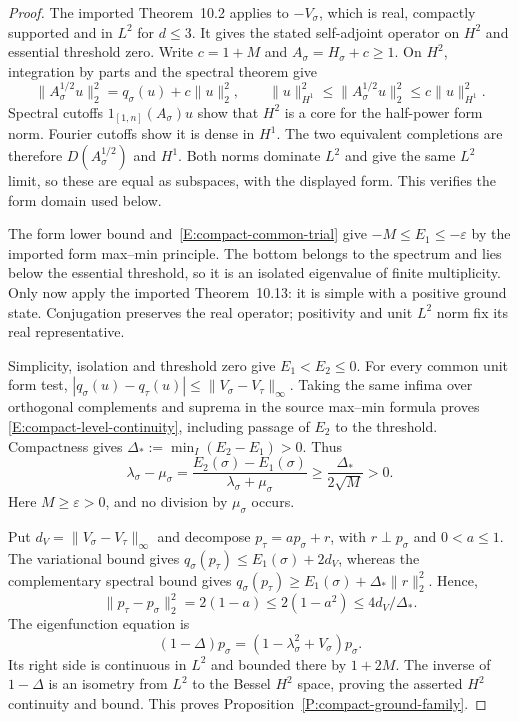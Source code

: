 \begin{proof}
  The imported Theorem~10.2 applies to $-V_\sigma$, which is real,
  compactly supported and in $L^2$ for $d\le3$. It gives the stated
  self-adjoint operator on $H^2$ and essential threshold zero.
  Write $c=1+M$ and $A_\sigma=H_\sigma+c\ge1$.
  On $H^2$, integration by parts and the spectral theorem give
  \[
    \|A_\sigma^{1/2}u\|_2^2
    =q_\sigma(u)+c\|u\|_2^2,\qquad
    \|u\|_{H^1}^2\le\|A_\sigma^{1/2}u\|_2^2
    \le c\|u\|_{H^1}^2.
  \]
  Spectral cutoffs $1_{[1,n]}(A_\sigma)u$ show that $H^2$ is a
  core for the half-power form norm. Fourier cutoffs show it is
  dense in $H^1$. The two equivalent completions are therefore
  $D(A_\sigma^{1/2})$ and $H^1$. Both norms dominate $L^2$ and
  give the same $L^2$ limit, so these are equal as subspaces, with
  the displayed form. This verifies the form domain used below.

  The form lower bound and~\eqref{E:compact-common-trial} give
  $-M\le E_1\le-\varepsilon$ by the imported form max--min principle.
  The bottom belongs to the spectrum and lies below the essential
  threshold, so it is an isolated eigenvalue of finite multiplicity.
  Only now apply the imported Theorem~10.13: it is simple with a
  positive ground state. Conjugation preserves the real operator;
  positivity and unit $L^2$ norm fix its real representative.

  Simplicity, isolation and threshold zero give $E_1<E_2\le0$.
  For every common unit form test,
  $|q_\sigma(u)-q_\tau(u)|\le\|V_\sigma-V_\tau\|_\infty$.
  Taking the same infima over orthogonal complements and suprema
  in the source max--min formula proves
  \eqref{E:compact-level-continuity}, including passage of $E_2$
  to the threshold. Compactness gives
  $\Delta_*:=\min_I(E_2-E_1)>0$. Thus
  \[
    \lambda_\sigma-\mu_\sigma
    =\frac{E_2(\sigma)-E_1(\sigma)}
    {\lambda_\sigma+\mu_\sigma}
    \ge\frac{\Delta_*}{2\sqrt M}>0.
  \]
  Here $M\ge\varepsilon>0$, and no division by $\mu_\sigma$ occurs.

  Put $d_V=\|V_\sigma-V_\tau\|_\infty$ and decompose
  $p_\tau=a p_\sigma+r$, with $r\perp p_\sigma$ and $0<a\le1$.
  The variational bound gives
  $q_\sigma(p_\tau)\le E_1(\sigma)+2d_V$, whereas the complementary
  spectral bound gives
  $q_\sigma(p_\tau)\ge E_1(\sigma)+\Delta_*\|r\|_2^2$.
  Hence,
  \begin{equation}\label{E:compact-ground-continuity}
    \|p_\tau-p_\sigma\|_2^2
    =2(1-a)\le2(1-a^2)\le4d_V/\Delta_*.
  \end{equation}
  The eigenfunction equation is
  \[
    (1-\Delta)p_\sigma
    =(1-\lambda_\sigma^2+V_\sigma)p_\sigma.
  \]
  Its right side is continuous in $L^2$ and bounded there by $1+2M$.
  The inverse of $1-\Delta$ is an isometry from $L^2$ to the Bessel
  $H^2$ space, proving the asserted $H^2$ continuity and bound.
  This proves Proposition~\ref{P:compact-ground-family}.
\end{proof}

